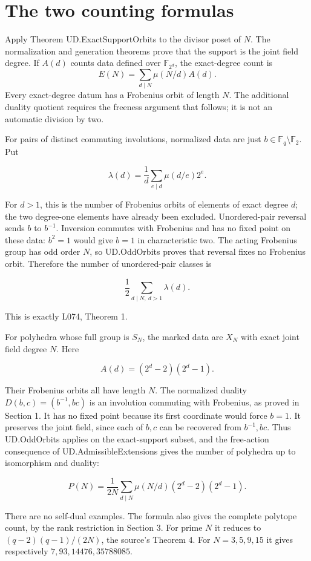 \section{The two counting formulas}\label{the-two-counting-formulas}

Apply Theorem UD.ExactSupportOrbits to the divisor poset of \(N\). The
normalization and generation theorems prove that the support is the
joint field degree. If \(A(d)\) counts data defined over
\(\mathbb F_{2^d}\), the exact-degree count is \[
E(N)=\sum_{d\mid N}\mu(N/d)A(d).
\tag{E3}
\] Every exact-degree datum has a Frobenius orbit of length \(N\). The
additional duality quotient requires the freeness argument that follows;
it is not an automatic division by two.

For pairs of distinct commuting involutions, normalized data are just
\(b\in\mathbb F_q\setminus\mathbb F_2\). Put

\[\lambda(d)=\frac1d\sum_{e\mid d}\mu(d/e)2^e.\]

For \(d>1\), this is the number of Frobenius orbits of elements of exact
degree \(d\); the two degree-one elements have already been excluded.
Unordered-pair reversal sends \(b\) to \(b^{-1}\). Inversion commutes
with Frobenius and has no fixed point on these data: \(b^2=1\) would
give \(b=1\) in characteristic two. The acting Frobenius group has odd
order \(N\), so UD.OddOrbits proves that reversal fixes no Frobenius
orbit. Therefore the number of unordered-pair classes is

\[\boxed{\frac12\sum_{d\mid N,\ d>1}\lambda(d).}\]

This is exactly L074, Theorem 1.

For polyhedra whose full group is \(S_N\), the marked data are \(X_N\)
with exact joint field degree \(N\). Here

\[A(d)=(2^d-2)(2^d-1).\]

Their Frobenius orbits all have length \(N\). The normalized duality
\(D(b,c)=(b^{-1},bc)\) is an involution commuting with Frobenius, as
proved in Section 1. It has no fixed point because its first coordinate
would force \(b=1\). It preserves the joint field, since each of
\(b,c\) can be recovered from \(b^{-1},bc\). Thus UD.OddOrbits applies
on the exact-support subset, and the free-action consequence of
UD.AdmissibleExtensions gives the number of polyhedra up to isomorphism
and duality:

\[\boxed{P(N)=\frac1{2N}\sum_{d\mid N}
   \mu(N/d)(2^d-2)(2^d-1).}\]

There are no self-dual examples. The formula also gives the complete
polytope count, by the rank restriction in Section 3. For prime \(N\) it
reduces to \((q-2)(q-1)/(2N)\), the source's Theorem 4. For
\(N=3,5,9,15\) it gives respectively \(7,93,14476,35788085\).

